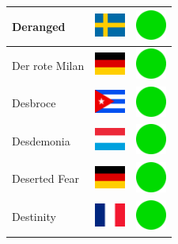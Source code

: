 \documentclass[12pt, a4paper, twoside]{report}
\begin{document}
\begin{center}
\begin{longtable}{|p{5cm}|p{2cm}|p{2cm}|}
Deranged & \includegraphics[width=1cm]{4x3/se} & \includegraphics[width=1cm]{likes/y} \\ \hline
Der rote Milan & \includegraphics[width=1cm]{4x3/de} & \includegraphics[width=1cm]{likes/y} \\ \hline
Desbroce & \includegraphics[width=1cm]{4x3/cu} & \includegraphics[width=1cm]{likes/y} \\ \hline
Desdemonia & \includegraphics[width=1cm]{4x3/lu} & \includegraphics[width=1cm]{likes/y} \\ \hline
Deserted Fear & \includegraphics[width=1cm]{4x3/de} & \includegraphics[width=1cm]{likes/y} \\ \hline
Destinity & \includegraphics[width=1cm]{4x3/fr} & \includegraphics[width=1cm]{likes/y} \\ \hline

\end{longtable}
\end{center}
\end{document}
